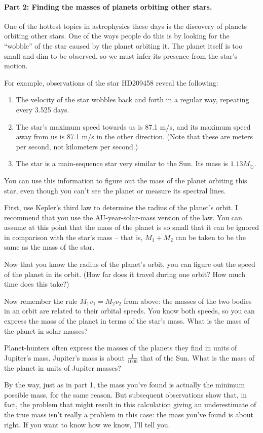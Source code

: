 \paragraph{Part 2: Finding the masses of planets orbiting other stars.}

One of the hottest topics in astrophysics these days is the discovery
of planets orbiting other stars. One of the ways people do this is
by looking for the ``wobble'' of the star caused by the planet
orbiting it. The planet itself is too small and dim to be observed,
so we must infer its presence from the star's motion.

For example, observations of the star HD209458 reveal the following:
\begin{enumerate}
\item The
velocity of the star wobbles back and forth in a regular way, repeating
every 3.525 days. 
\item The star's maximum speed towards us is 87.1 m/s,
and its maximum speed away from us is 87.1 m/s in the other direction.
(Note that these are meters per second, not kilometers per second.)
\item The star is a main-sequence star very similar to the Sun.
Its mass is $1.13M_\odot$.
\end{enumerate}

You can use this information to figure out the mass of the planet
orbiting this star, even though you can't see the planet or measure
its spectral lines.

First, use Kepler's third law to determine the radius of the
planet's orbit. I recommend that you use the AU-year-solar-mass
version of the law. You can assume at this point that the
mass of the planet is so small that it can be ignored in comparison
with the star's mass -- that is, $M_1+M_2$ can be taken to be the
same as the mass of the star.


Now that you know the radius of the planet's orbit, you can figure out
the speed of the planet in its orbit. (How far does it travel during
one orbit? How much time does this take?)

\answerspace{2in}

Now remember the rule $M_1v_1=M_2v_2$ from above: the masses of the two
bodies in an orbit are related to their orbital speeds. You know both
speeds, so you can express the mass of the planet in terms of the
star's mass. What is the mass of the planet in solar masses?

\answerspace{2in}

Planet-hunters often express the masses of the planets they find
in units of Jupiter's mass. Jupiter's mass is about $\frac{1}{1000}$
that of the Sun. What is the mass of the planet in units of Jupiter masses?

\answerspace{1in}

By the way, just as in part 1, the mass you've found is actually
the minimum possible mass, for the same reason. But subsequent
observations show that, in fact, the problem that might result
in this calculation giving an underestimate of the true mass
isn't really a problem in this case: the mass you've found is about right.
If you want to know how we know, I'll tell you.


